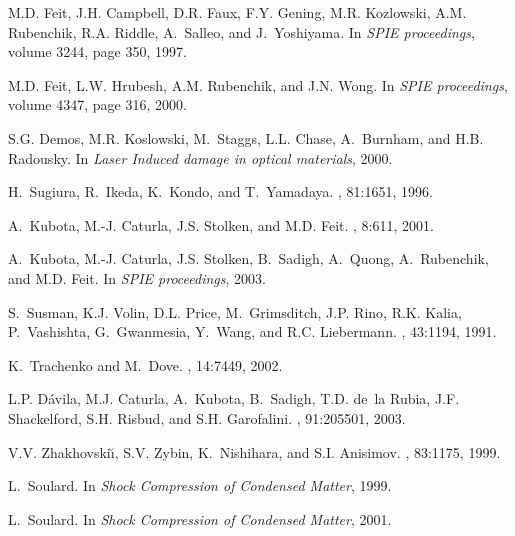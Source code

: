 \documentclass[aps,10pt,twocolumn]{revtex4}
\begin{document}
\begin{thebibliography}{10}

M.D. Feit, J.H. Campbell, D.R. Faux, F.Y. Gening, M.R. Kozlowski, A.M.
  Rubenchik, R.A. Riddle, A.~Salleo, and J.~Yoshiyama.
\newblock In {\em SPIE proceedings}, volume 3244, page 350, 1997.

M.D. Feit, L.W. Hrubesh, A.M. Rubenchik, and J.N. Wong.
\newblock In {\em SPIE proceedings}, volume 4347, page 316, 2000.

S.G. Demos, M.R. Koslowski, M.~Staggs, L.L. Chase, A.~Burnham, and H.B.
  Radousky.
\newblock In {\em Laser Induced damage in optical materials}, 2000.

H.~Sugiura, R.~Ikeda, K.~Kondo, and T.~Yamadaya.
, 81:1651, 1996.

A.~Kubota, M.-J. Caturla, J.S. Stolken, and M.D. Feit.
, 8:611, 2001.

A.~Kubota, M.-J. Caturla, J.S. Stolken, B.~Sadigh, A.~Quong, A.~Rubenchik, and
  M.D. Feit.
\newblock In {\em SPIE proceedings}, 2003.

S.~Susman, K.J. Volin, D.L. Price, M.~Grimsditch, J.P. Rino, R.K. Kalia,
  P.~Vashishta, G.~Gwanmesia, Y.~Wang, and R.C. Liebermann.
, 43:1194, 1991.

K.~Trachenko and M.~Dove.
, 14:7449, 2002.

L.P. D\'avila, M.J. Caturla, A.~Kubota, B.~Sadigh, T.D. de~la Rubia, J.F.
  Shackelford, S.H. Risbud, and S.H. Garofalini.
, 91:205501, 2003.

V.V. Zhakhovski\u{\i}, S.V. Zybin, K.~Nishihara, and S.I. Anisimov.
, 83:1175, 1999.

L.~Soulard.
\newblock In {\em Shock Compression of Condensed Matter}, 1999.

L.~Soulard.
\newblock In {\em Shock Compression of Condensed Matter}, 2001.


\end{thebibliography}
\end{document}
